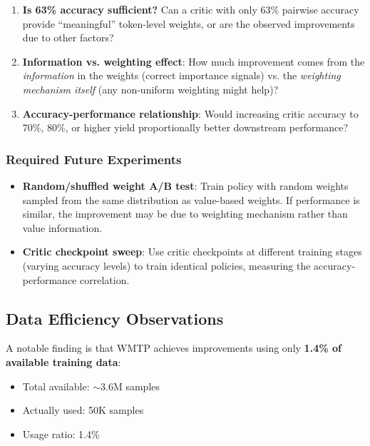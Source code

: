 \begin{enumerate}
    \item \textbf{Is 63\% accuracy sufficient?} Can a critic with only 63\% pairwise accuracy provide ``meaningful'' token-level weights, or are the observed improvements due to other factors?

    \item \textbf{Information vs. weighting effect}: How much improvement comes from the \textit{information} in the weights (correct importance signals) vs. the \textit{weighting mechanism itself} (any non-uniform weighting might help)?

    \item \textbf{Accuracy-performance relationship}: Would increasing critic accuracy to 70\%, 80\%, or higher yield proportionally better downstream performance?
\end{enumerate}

\subsubsection{Required Future Experiments}

\begin{itemize}[nosep]
    \item \textbf{Random/shuffled weight A/B test}: Train policy with random weights sampled from the same distribution as value-based weights. If performance is similar, the improvement may be due to weighting mechanism rather than value information.

    \item \textbf{Critic checkpoint sweep}: Use critic checkpoints at different training stages (varying accuracy levels) to train identical policies, measuring the accuracy-performance correlation.
\end{itemize}

\subsection{Data Efficiency Observations}

A notable finding is that WMTP achieves improvements using only \textbf{1.4\% of available training data}:

\begin{itemize}[nosep]
    \item Total available: $\sim$3.6M samples
    \item Actually used: 50K samples
    \item Usage ratio: 1.4\%
\end{itemize}

